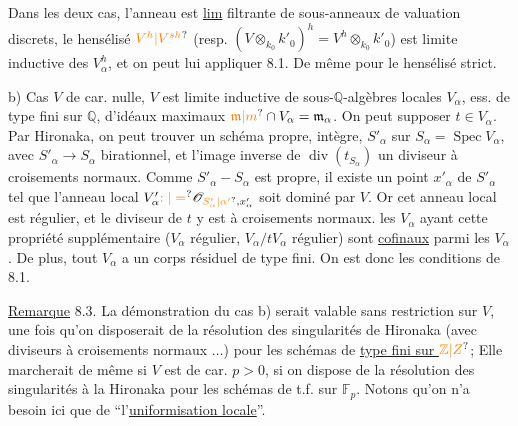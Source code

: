 Dans  les deux cas, l'anneau   est \uline{lim} filtrante  de  sous-anneaux de valuation discrets,   le hensélisé $\unsure{V^h|V^{sh}}$ (resp. $(V\otimes_{k_0}k'_0)^h=V^h\otimes_{k_0}k'_0$) est limite inductive des $V_\alpha^h$, et on peut lui appliquer 8.1. De même pour le hensélisé strict. 

b) Cas $V$ de car. nulle,  $V$ est limite inductive de  sous-$\mathbb Q$-algèbres locales $V_\alpha$, ess. de type fini sur $\mathbb Q$,  d'idéaux maximaux $\unsure{\mathfrak m|m}\cap V_\alpha=\mathfrak m_\alpha$. On peut supposer $t\in V_\alpha$. Par Hironaka, on peut trouver un  schéma propre,  intègre,  $S'_\alpha$ sur $S_\alpha=\operatorname{Spec}V_\alpha$, avec $S'_\alpha\to S_\alpha$ birationnel, et l'image inverse   de $\operatorname{div}(t_{S_\alpha})$ un diviseur à croisements normaux.  Comme $S'_\alpha-S_\alpha$ est propre, il existe un point $x'_\alpha$ de $S'_\alpha$ tel que l'anneau local $V'_\alpha\unsure{:|=}\mathscr O_{\unsure{S'_\alpha|\alpha'},x'_\alpha}$ soit dominé par $V$.  Or cet anneau local est régulier, et le diviseur de $t$ y est à croisements normaux.
 les $V_\alpha$ ayant cette propriété supplémentaire
($V_\alpha$ régulier,  $V_\alpha/tV_\alpha$ régulier) sont \uline{cofinaux} parmi les $V_\alpha$. De plus, tout $V_\alpha$ a un corps résiduel de type fini. On est donc  les conditions de 8.1.

\uline{Remarque} 8.3.  La démonstration du cas b)  serait valable sans restriction sur $V$, une fois qu'on disposerait de la résolution des singularités  de Hironaka  (avec diviseurs à croisements normaux $\ldots$) pour les schémas de \uline{type fini sur $\unsure{\mathbb Z|Z}$};  Elle marcherait de même si $V$ est de car. $p>0$, si on dispose de la résolution des singularités à la Hironaka pour les schémas de t.f. sur $\mathbb F_p$. Notons qu'on n'a besoin ici  que de ``l'\uline{uniformisation locale}''.


